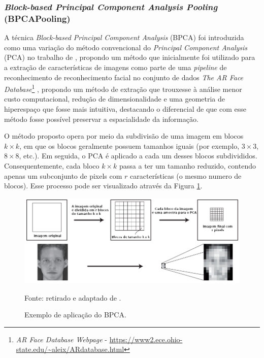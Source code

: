 \subsubsection{\textit{Block-based Principal Component Analysis Pooling} (BPCAPooling)}
\label{project:bpca}
A técnica \textit{Block-based Principal Component Analysis} (BPCA) foi introduzida como uma variação do método convencional do \textit{Principal Component Analysis} (PCA) no trabalho de \cite{Salvadeo2011}, propondo um método que inicialmente foi utilizado para a extração de características de imagens como parte de uma \textit{pipeline} de reconhecimento de reconhecimento facial no conjunto de dados \textit{The AR Face Database}\footnote{\textit{AR Face Database Webpage} - \url{https://www2.ece.ohio-state.edu/~aleix/ARdatabase.html}} \citep{MartNez1998TheDatabase} , propondo um método de extração que trouxesse à análise menor custo computacional, redução de dimensionalidade e uma geometria de hiperespaço que fosse mais intuitiva, destacando o diferencial de que com esse método fosse possível preservar a espacialidade da informação.

O método proposto opera por meio da subdivisão de uma imagem em blocos $k \times k$, em que os blocos geralmente possuem tamanhos iguais (por exemplo, $3 \times 3$, $8 \times 8$, etc.). Em seguida, o PCA é aplicado a cada um desses blocos subdivididos. Consequentemente, cada bloco $k \times k$ passa a ter um tamanho reduzido, contendo apenas um subconjunto de pixels com $r$ características (o mesmo numero de blocos). Esse processo pode ser visualizado através da Figura \ref{project:fig:bpca_1}.

\begin{figure}[H]
    \centering
    \caption{Exemplo de aplicação do BPCA.}
    \label{project:fig:bpca_1}
    \includegraphics[width=1\textwidth]{recursos/imagens/project/BPCA.png}

    Fonte: retirado e adaptado de \cite{Salvadeo2011}.
\end{figure}

